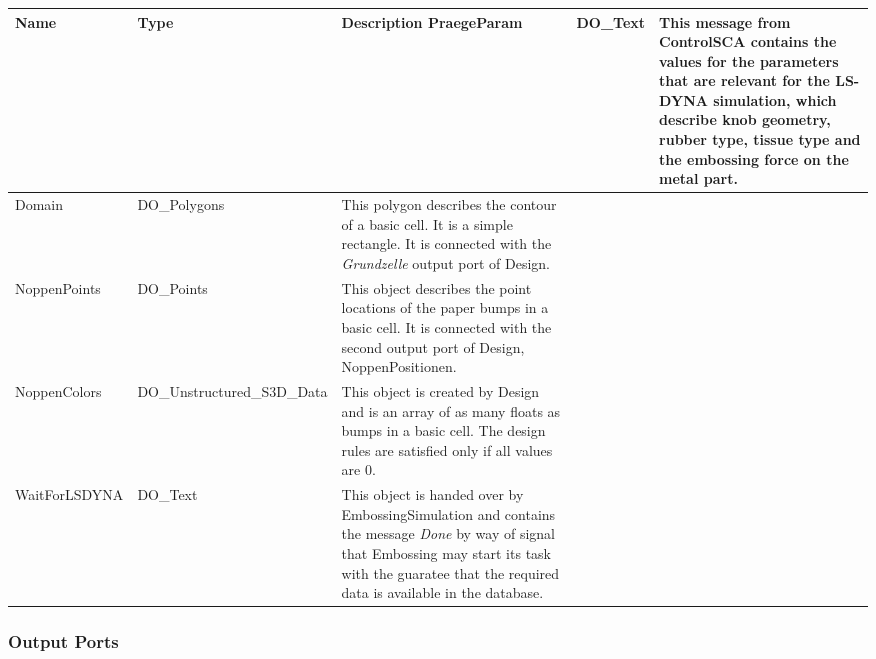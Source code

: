 \begin{htmlonly}
\begin{longtable}{|p{3.5cm}|p{4cm}|p{7cm}|}
\hline
   \bf{Name} & \bf{Type} & \bf{Description} \endhead
\hline\hline
	\textcolor{required}{PraegeParam} & DO\_Text & 
                 This message from ControlSCA
                 contains the values for the parameters
                 that are relevant for the LS-DYNA simulation,
                 which describe
                 knob geometry, rubber type, tissue type and the
                 embossing force on the metal part.\\
\hline
	\textcolor{required}{Domain} & DO\_Polygons & 
                    This polygon describes the contour of a
                    basic cell. It is a simple rectangle.
                    It is connected with the {\sl Grundzelle}
                    output port of Design.\\
\hline
	\textcolor{required}{NoppenPoints} & DO\_Points & 
                    This object describes the point locations
                    of the paper bumps in a basic cell.
                    It is connected with the second output
                    port of Design, NoppenPositionen.\\
\hline
	\textcolor{required}{NoppenColors} & DO\_Unstructured\_S3D\_Data & 
                    This object is created by Design and is
                    an array of as many floats as bumps in
                    a basic cell. The design rules are
                    satisfied only if all values are 0.\\
\hline
	\textcolor{required}{WaitForLSDYNA} & DO\_Text & 
                    This object is handed over by EmbossingSimulation
                    and contains the message {\sl Done} by way of
                    signal that Embossing may start its task
                    with the guaratee that the required data
                    is available in the database.\\ 
                     
                    
														

\hline
\end{longtable}



%
\subsubsection{Output Ports}
%


\end{htmlonly}
